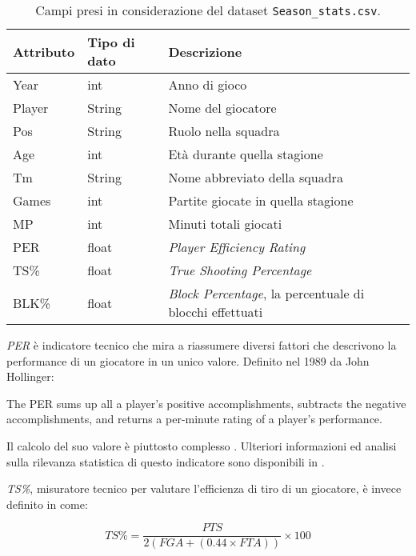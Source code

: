 \begin{center}
	\begin{longtable}[m]{|m{5em} m{7em} m{16em}|} 

		\caption{Campi presi in considerazione del dataset \texttt{Season\_stats.csv}.\label{tabella_seasons_stats}}\\
		\hline
		\bfseries{Attributo} & \bfseries{Tipo di dato} & \bfseries{Descrizione} \\
		\hline

		Year & int & Anno di gioco\\ 
		\hline
		Player & String & Nome del giocatore\\ 
		\hline
		Pos & String & Ruolo nella squadra\\ 
		\hline
		Age & int & Età durante quella stagione\\ 
		\hline
		Tm & String & Nome abbreviato della squadra\\
		\hline
		Games & int & Partite giocate in quella stagione\\ 
		\hline
		MP & int & Minuti totali giocati\\ 
		\hline
		PER & float & \textit{Player Efficiency Rating}\\ 
		\hline
		TS\% & float & \textit{True Shooting Percentage}\\ 
		\hline
		BLK\% & float & \textit{Block Percentage}, la percentuale di blocchi effettuati \\ 
		\hline

	\end{longtable}
\end{center}
\textit{PER} è indicatore tecnico che mira a riassumere diversi fattori che descrivono la performance di un giocatore in un unico valore.
Definito nel 1989 da John Hollinger:
\begin{displayquote}
 The PER sums up all a player's positive accomplishments, subtracts the negative accomplishments, and returns a per-minute rating of a player's performance. 
 \end{displayquote}
Il calcolo del suo valore è piuttosto complesso \cite{BRper}. Ulteriori informazioni ed analisi sulla rilevanza statistica di questo indicatore sono disponibili in \cite{10.1007/978-3-642-22456-0_34}.
\par
\textit{TS\%}, misuratore tecnico per valutare l’efficienza di tiro di un giocatore, è invece definito in \cite{BRglossary} come:

\begin{equation}
TS\% = \frac{PTS}{ 2(FGA + (0.44 \times FTA))}\times100
\end{equation}

